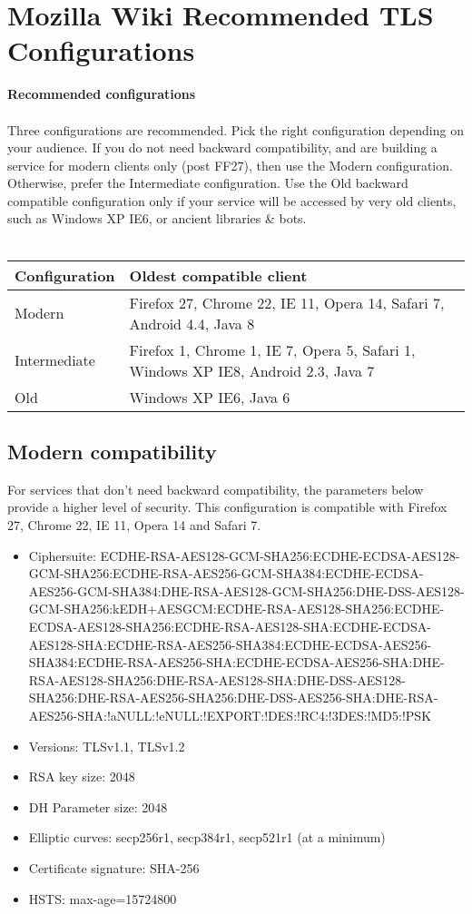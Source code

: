 \section{Mozilla Wiki Recommended TLS Configurations}
\textbf{Recommended configurations}\\\\
Three configurations are recommended. Pick the right configuration depending on your audience. If you do not need backward compatibility, and are building a service for modern clients only (post FF27), then use the Modern configuration. Otherwise, prefer the Intermediate configuration. Use the Old backward compatible configuration only if your service will be accessed by very old clients, such as Windows XP IE6, or ancient libraries \& bots.\\\\
\begin{tabularx}{\textwidth}{ l | X }
Configuration & Oldest compatible client\\
\hline
Modern & Firefox 27, Chrome 22, IE 11, Opera 14, Safari 7, Android 4.4, Java 8\\
\hline
Intermediate & Firefox 1, Chrome 1, IE 7, Opera 5, Safari 1, Windows XP IE8, Android 2.3, Java 7\\
\hline
Old	& Windows XP IE6, Java 6\\
\hline
\end{tabularx}
\subsection{Modern compatibility}
For services that don't need backward compatibility, the parameters below provide a higher level of security. This configuration is compatible with Firefox 27, Chrome 22, IE 11, Opera 14 and Safari 7.
\begin{itemize}
\item Ciphersuite: ECDHE-RSA-AES128-GCM-SHA256:ECDHE-ECDSA-AES128-GCM-SHA256:ECDHE-RSA-AES256-GCM-SHA384:ECDHE-ECDSA-AES256-GCM-SHA384:DHE-RSA-AES128-GCM-SHA256:DHE-DSS-AES128-GCM-SHA256:kEDH+AESGCM:ECDHE-RSA-AES128-SHA256:ECDHE-ECDSA-AES128-SHA256:ECDHE-RSA-AES128-SHA:ECDHE-ECDSA-AES128-SHA:ECDHE-RSA-AES256-SHA384:ECDHE-ECDSA-AES256-SHA384:ECDHE-RSA-AES256-SHA:ECDHE-ECDSA-AES256-SHA:DHE-RSA-AES128-SHA256:DHE-RSA-AES128-SHA:DHE-DSS-AES128-SHA256:DHE-RSA-AES256-SHA256:DHE-DSS-AES256-SHA:DHE-RSA-AES256-SHA:!aNULL:!eNULL:!EXPORT:!DES:!RC4:!3DES:!MD5:!PSK
\item Versions: TLSv1.1, TLSv1.2
\item RSA key size: 2048
\item DH Parameter size: 2048
\item Elliptic curves: secp256r1, secp384r1, secp521r1 (at a minimum)
\item Certificate signature: SHA-256
\item HSTS: max-age=15724800
\end{itemize}

